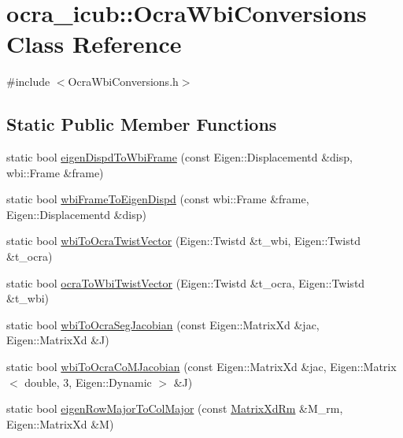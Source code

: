 \hypertarget{classocra__icub_1_1OcraWbiConversions}{\section{ocra\-\_\-icub\-:\-:\-Ocra\-Wbi\-Conversions \-Class \-Reference}
\label{classocra__icub_1_1OcraWbiConversions}
}


{\ttfamily \#include $<$\-Ocra\-Wbi\-Conversions.\-h$>$}

\subsection*{\-Static \-Public \-Member \-Functions}
\begin{DoxyCompactItemize}
\item 
static bool \hyperlink{classocra__icub_1_1OcraWbiConversions_af71562a5f3d4f6e649f1cec0a3d9996b}{eigen\-Dispd\-To\-Wbi\-Frame} (const \-Eigen\-::\-Displacementd \&disp, wbi\-::\-Frame \&frame)
\item 
static bool \hyperlink{classocra__icub_1_1OcraWbiConversions_a403627efa183c8ddbbccabf0dcd5bcaf}{wbi\-Frame\-To\-Eigen\-Dispd} (const wbi\-::\-Frame \&frame, \-Eigen\-::\-Displacementd \&disp)
\item 
static bool \hyperlink{classocra__icub_1_1OcraWbiConversions_a37c2aea3bf156928cb90a16655c24cc9}{wbi\-To\-Ocra\-Twist\-Vector} (\-Eigen\-::\-Twistd \&t\-\_\-wbi, \-Eigen\-::\-Twistd \&t\-\_\-ocra)
\item 
static bool \hyperlink{classocra__icub_1_1OcraWbiConversions_a7725aea95eb71c805def4a064a2693fa}{ocra\-To\-Wbi\-Twist\-Vector} (\-Eigen\-::\-Twistd \&t\-\_\-ocra, \-Eigen\-::\-Twistd \&t\-\_\-wbi)
\item 
static bool \hyperlink{classocra__icub_1_1OcraWbiConversions_a25a64172ebb14db9ddf301880a433964}{wbi\-To\-Ocra\-Seg\-Jacobian} (const \-Eigen\-::\-Matrix\-Xd \&jac, \-Eigen\-::\-Matrix\-Xd \&\-J)
\item 
static bool \hyperlink{classocra__icub_1_1OcraWbiConversions_a86458de950caa3bde3aa1d1aff448be1}{wbi\-To\-Ocra\-Co\-M\-Jacobian} (const \-Eigen\-::\-Matrix\-Xd \&jac, \-Eigen\-::\-Matrix$<$ double, 3, \-Eigen\-::\-Dynamic $>$ \&\-J)
\item 
static bool \hyperlink{classocra__icub_1_1OcraWbiConversions_ac03ed9581c49479b3ade94d58a3295b4}{eigen\-Row\-Major\-To\-Col\-Major} (const \hyperlink{namespaceocra__icub_aa5e36a19ed031c28ca83c207bd7dd83f}{\-Matrix\-Xd\-Rm} \&\-M\-\_\-rm, \-Eigen\-::\-Matrix\-Xd \&\-M)

\end{DoxyCompactItemize}
